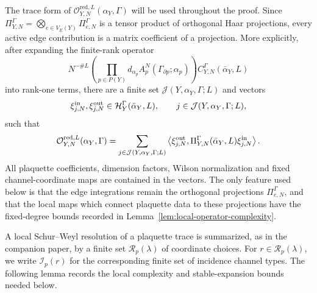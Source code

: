 \documentclass[11pt,a4paper,reqno]{amsart}
\theoremstyle{definition}
\theoremstyle{remark}
\begin{document}
The trace form of $\mathcal O_{Y,N}^{\mathrm{red},L}(\alpha_Y,\Gamma)$ will be used throughout the proof. Since $\Pi^\Gamma_{Y,N}=\bigotimes_{e\in V_E(Y)}\Pi^\Gamma_{e,N}$ is a tensor product of orthogonal Haar projections, every active edge contribution is a matrix coefficient of a projection. More explicitly, after expanding the finite-rank operator
\[
N^{-\#L}
\left(\prod_{p\in P(Y)}d_{\alpha_p}A_p^N(\Gamma_{\partial p};\alpha_p)\right)
C_{Y,N}^\Gamma(\bar\alpha_Y,L)
\]
into rank-one terms, there are a finite set $\mathcal J(Y,\alpha_Y,\Gamma;L)$ and vectors
\[
\xi^{\rm in}_{j,N},\xi^{\rm out}_{j,N}
\in
\mathcal H_Y^\Gamma(\bar\alpha_Y,L),
\qquad j\in\mathcal J(Y,\alpha_Y,\Gamma;L),
\]
such that
\begin{equation}\label{eq:operator-block-contraction}
\mathcal O_{Y,N}^{\mathrm{red},L}(\alpha_Y,\Gamma)=\sum_{j\in\mathcal J(Y,\alpha_Y,\Gamma;L)}\left\langle\xi^{\rm out}_{j,N},\Pi^\Gamma_{Y,N}(\bar\alpha_Y,L)\xi^{\rm in}_{j,N}\right\rangle .
\end{equation}
All plaquette coefficients, dimension factors, Wilson normalization and fixed channel-coordinate maps are contained in the vectors. The only feature used below is that the edge integrations remain the orthogonal projections $\Pi^\Gamma_{e,N}$, and that the local maps which connect plaquette data to these projections have the fixed-degree bounds recorded in Lemma~\ref{lem:local-operator-complexity}.

A local Schur--Weyl resolution of a plaquette trace is summarized, as in the companion paper, by a finite set $\mathcal R_p(\lambda)$ of coordinate choices.  For $r\in\mathcal R_p(\lambda)$, we write $\mathcal I_p(r)$ for the corresponding finite set of incidence channel types.  The following lemma records the local complexity and stable-expansion bounds needed below.
\end{document}
